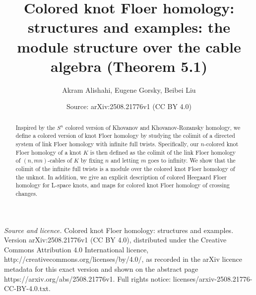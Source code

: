 \documentclass[10pt,a4paper]{amsart}
\title[The module structure over the cable algebra]{Colored knot Floer homology: structures and examples: the module structure over the cable algebra (Theorem 5.1)}\author{Akram Alishahi, Eugene Gorsky, Beibei Liu}
\date{Source: arXiv:2508.21776v1 (CC BY 4.0)}
\theoremstyle{plain}
\begin{document}
\begin{abstract}
Inspired by the $S^n$ colored version of Khovanov and Khovanov-Rozansky homology, we define a colored version of knot Floer homology by studying the colimit of a directed system of link Floer homology with infinite full twists. Specifically,  our $n$-colored knot Floer homology of a knot $K$ is then defined as the colimit of the link Floer homology of $(n, mn)$-cables of  $K$ by fixing $n$ and letting $m$ goes to infinity. We show that the colimit of the infinite full twists is a module over the colored knot Floer homology of the unknot.  In addition,  we give an explicit description of colored  Heegaard Floer homology for L-space knots, and maps for colored knot Floer homology of crossing changes. 


\end{abstract}
\maketitle

\noindent\emph{Source and licence.} Colored knot Floer homology: structures and examples. Version arXiv:2508.21776v1 (CC BY 4.0), distributed under the Creative Commons Attribution 4.0 International licence, http://creativecommons.org/licenses/by/4.0/, as recorded in the arXiv licence metadata for this exact version and shown on the abstract page https://arxiv.org/abs/2508.21776v1. Full rights notice: licenses/arxiv-2508.21776-CC-BY-4.0.txt.\par\smallskip
\end{document}
